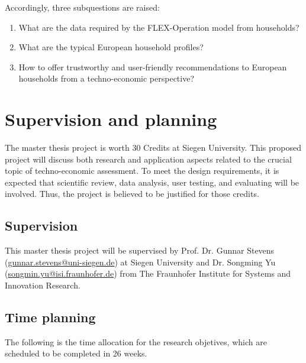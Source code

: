 Accordingly, three subquestions are raised: 

\begin{enumerate}
  \item What are the data required by the FLEX-Operation model from households? 
  \item What are the typical European household profiles? 
  \item How to offer trustworthy and user-friendly recommendations to European households from a techno-economic perspective? 
\end{enumerate}




\section{Supervision and planning} 




The master thesis project is worth 30 Credits at Siegen University. 
This proposed project will discuss both research and application aspects 
related to the crucial topic of techno-economic assessment. 
To meet the design requirements, 
it is expected that scientific review, data analysis, user testing, and evaluating will be involved. 
Thus, the project is believed to be justified for those credits.


\subsection{Supervision}


This master thesis project will be supervised by 
Prof. Dr. Gunnar Stevens (\href{mailto:gunnar.stevens@uni-siegen.de}{gunnar.stevens@uni-siegen.de}) at Siegen University and 
Dr. Songming Yu (\href{mailto:songmin.yu@isi.fraunhofer.de}{songmin.yu@isi.fraunhofer.de}) from The Fraunhofer Institute for Systems and Innovation Research. 


\subsection{Time planning}


The following is the time allocation for the research objetives, 
which are scheduled to be completed in 26 weeks. \\

